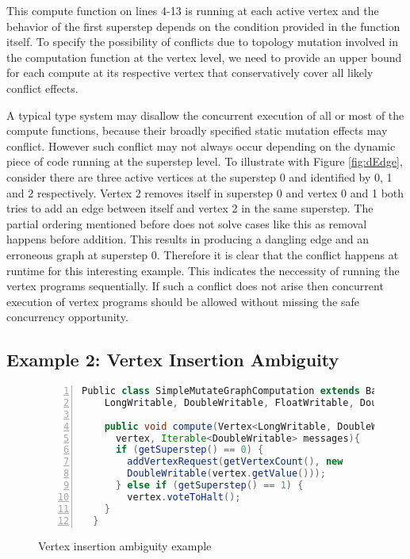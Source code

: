 This compute function on lines 4-13 is running at each active vertex and the behavior of the first superstep depends on the condition provided in the function itself. To specify the possibility of conflicts due to topology mutation involved in the computation function at the vertex level, we need to provide an upper bound for each compute at its respective vertex that conservatively cover all likely conflict effects.

A typical type system may disallow the concurrent execution of all or most of the compute functions, because their broadly specified static mutation effects may conflict. However such conflict may not always occur depending on the dynamic piece of code running at the superstep level. To illustrate with Figure \ref{fig:dEdge}, consider there are three active vertices at the superstep 0 and identified by 0, 1 and 2 respectively. Vertex 2 removes itself in superstep 0 and vertex 0 and 1 both tries to add an edge between itself and vertex 2 in the same superstep. The partial ordering mentioned before does not solve cases like this as removal happens before addition. This results in producing a dangling edge and an erroneous graph at superstep 0. Therefore it is clear that the conflict happens at runtime for this interesting example. This indicates the neccessity of running the vertex programs sequentially. If such a conflict does not arise then concurrent execution of vertex programs should be allowed without missing the safe concurrency opportunity. 



\subsection{Example 2: Vertex Insertion Ambiguity}
\label{subsec:example2}


\begin{figure}[h]
\begin{center}
\begin{lstlisting}[frame=tb, keywordstyle=\color{blue}, backgroundcolor=\color{white}, basicstyle=\footnotesize\ttfamily, language=Java, numbers=left, numberstyle=\tiny\color{black}]
  Public class SimpleMutateGraphComputation extends BasicComputation<
    LongWritable, DoubleWritable, FloatWritable, DoubleWritable> {

    public void compute(Vertex<LongWritable, DoubleWritable, FloatWritable>
      vertex, Iterable<DoubleWritable> messages){ 
      if (getSuperstep() == 0) {
      	addVertexRequest(getVertexCount(), new
      	DoubleWritable(vertex.getValue()));
      } else if (getSuperstep() == 1) {
        vertex.voteToHalt();
    } 
  }
\end{lstlisting}
\end{center}
\caption{Vertex insertion ambiguity example}
\label{fig:vInsert}
\end{figure}


